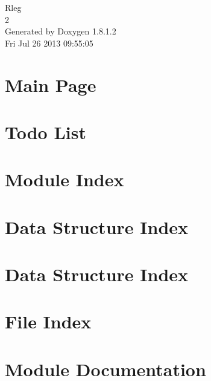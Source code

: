 \documentclass{book}
\begin{document}
\hypersetup{pageanchor=false,citecolor=blue}
\begin{titlepage}
\vspace*{7cm}
\begin{center}
{\Large Rleg \\[1ex]\large 2 }\\
\vspace*{1cm}
{\large Generated by Doxygen 1.8.1.2}\\
\vspace*{0.5cm}
{\small Fri Jul 26 2013 09:55:05}\\
\end{center}
\end{titlepage}
\clearemptydoublepage
{}
\tableofcontents
\clearemptydoublepage
{}
\hypersetup{pageanchor=true,citecolor=blue}
\chapter{Main Page}
\label{index}\hypertarget{index}{}
\chapter{Todo List}
\label{todo}
\hypertarget{todo}{}

\chapter{Module Index}

\chapter{Data Structure Index}

\chapter{Data Structure Index}

\chapter{File Index}

\chapter{Module Documentation}







\end{document}
